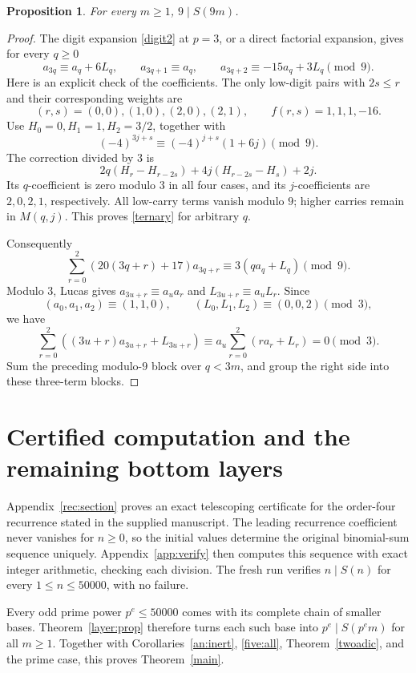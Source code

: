 \documentclass[11pt,a4paper]{article}
\newtheorem{proposition}[theorem]{Proposition}
\theoremstyle{remark}\newtheorem{remark}[theorem]{Remark}
\begin{document}
\begin{proposition}\label{nine}
For every \(m\ge1\), \(9\mid S(9m)\).
\end{proposition}
\begin{proof}
The digit expansion \eqref{digit2} at \(p=3\), or a direct factorial
expansion, gives for every \(q\ge0\)
\begin{equation}\label{ternary}
 a_{3q}\equiv a_q+6L_q,\qquad
 a_{3q+1}\equiv a_q,\qquad
 a_{3q+2}\equiv-15a_q+3L_q\pmod9.
\end{equation}
Here is an explicit check of the coefficients. The only low-digit
pairs with \(2s\le r\) and their corresponding weights are
\[
 (r,s)=(0,0),(1,0),(2,0),(2,1),\qquad f(r,s)=1,1,1,-16.
\]
Use \(H_0=0,H_1=1,H_2=3/2\), together with
\[
 (-4)^{3j+s}\equiv(-4)^{j+s}(1+6j)\pmod9.
\]
The correction divided by \(3\) is
\[
 2q(H_r-H_{r-2s})+4j(H_{r-2s}-H_s)+2j .
\]
Its \(q\)-coefficient is zero modulo \(3\) in all four cases, and its
\(j\)-coefficients are \(2,0,2,1\), respectively.
All low-carry terms vanish modulo \(9\); higher carries remain in
\(M(q,j)\). This proves \eqref{ternary} for arbitrary \(q\).

Consequently
\[
 \sum_{r=0}^2(20(3q+r)+17)a_{3q+r}
 \equiv3(q a_q+L_q)\pmod9.
\]
Modulo \(3\), Lucas gives \(a_{3u+r}\equiv a_u a_r\) and
\(L_{3u+r}\equiv a_u L_r\). Since
\[
 (a_0,a_1,a_2)\equiv(1,1,0),\qquad
 (L_0,L_1,L_2)\equiv(0,0,2)\pmod3,
\]
we have
\[
 \sum_{r=0}^2((3u+r)a_{3u+r}+L_{3u+r})
 \equiv a_u\sum_{r=0}^2(r a_r+L_r)=0\pmod3.
\]
Sum the preceding modulo-\(9\) block over \(q<3m\), and group the
right side into these three-term blocks.
\end{proof}


\section{Certified computation and the remaining bottom layers}\label{sec:computations}

Appendix~\ref{rec:section} proves an exact telescoping certificate for the
order-four recurrence stated in the supplied manuscript.
The leading recurrence coefficient never vanishes for \(n\ge0\), so
the initial values determine the original binomial-sum sequence uniquely.
Appendix~\ref{app:verify} then computes this sequence with exact integer
arithmetic, checking each division. The fresh run verifies
\(n\mid S(n)\) for every \(1\le n\le50000\), with no failure.

Every odd prime power \(p^e\le50000\) comes with its complete chain of
smaller bases. Theorem~\ref{layer:prop} therefore turns each such base
into \(p^e\mid S(p^em)\) for all \(m\ge1\).
Together with Corollaries~\ref{an:inert}, \ref{five:all},
Theorem~\ref{twoadic}, and the prime case, this proves
Theorem~\ref{main}.
\end{document}
